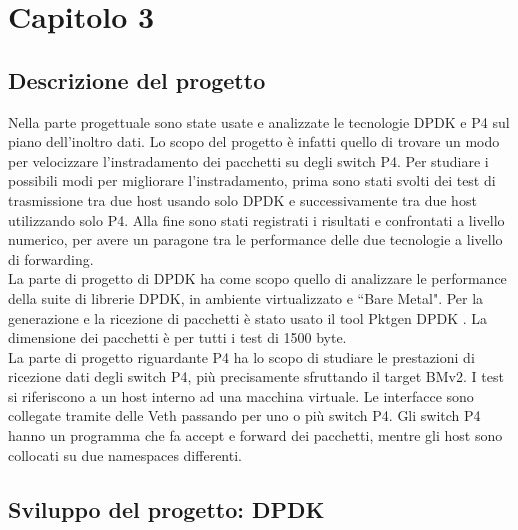 \chapter*{Capitolo 3}

\section*{Descrizione del progetto}
Nella parte progettuale sono state usate e analizzate le tecnologie DPDK e P4 sul piano dell'inoltro dati. Lo scopo del progetto è infatti quello di trovare un modo per velocizzare l'instradamento dei pacchetti su degli switch P4. Per studiare i possibili modi per migliorare l'instradamento, prima sono stati svolti dei test di trasmissione tra due host usando solo DPDK e successivamente tra due host utilizzando solo P4. Alla fine sono stati registrati i risultati e confrontati a livello numerico, per avere un paragone tra le performance delle due tecnologie a livello di forwarding.
\newline
\\
La parte di progetto di DPDK ha come scopo quello di analizzare le performance della suite di librerie DPDK, in ambiente virtualizzato e ``Bare Metal". Per la generazione e la ricezione di pacchetti è stato usato il tool Pktgen DPDK \cite{wiles_pktgen_2022}.
La dimensione dei pacchetti è per tutti i test di 1500 byte.
\newline
\\
La parte di progetto riguardante P4 ha lo scopo di studiare le prestazioni di ricezione dati degli switch P4, più precisamente sfruttando il target BMv2. I test si riferiscono a un host interno ad una macchina virtuale. Le interfacce sono collegate tramite delle Veth passando per uno o più switch P4.
Gli switch P4 hanno un programma che fa accept e forward dei pacchetti, mentre gli host sono collocati su due namespaces differenti.

\section*{Sviluppo del progetto: DPDK}


